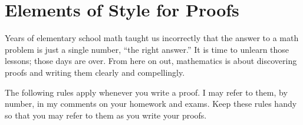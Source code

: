 \appendix
\chapter{Elements of Style for Proofs}
\label{appendix:elements_of_style}
\thispagestyle{empty}

Years of elementary school math taught us incorrectly that the answer to a math problem is just a single number, ``the right answer.''  It is time to unlearn those lessons; those days are over.  From here on out, mathematics is about discovering proofs and writing them clearly and compellingly.

The following rules apply whenever you write a proof.  I may refer to them, by number, in my comments on your homework and exams.  Keep these rules handy so that you may refer to them as you write your proofs.

